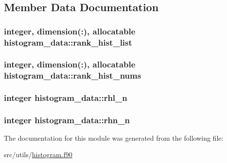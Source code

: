 \subsection{Member Data Documentation}
\hypertarget{classhistogram__data_a2f7cb336d665046859ebe5684ed09be8}{
\subsubsection[{rank\-\_\-hist\-\_\-list}]{\setlength{\rightskip}{0pt plus 5cm}integer, dimension(\-:), allocatable histogram\-\_\-data\-::rank\-\_\-hist\-\_\-list}}\label{classhistogram__data_a2f7cb336d665046859ebe5684ed09be8}
\hypertarget{classhistogram__data_a94a5c8fc25a86b8f62b2ff301de78d32}{
\subsubsection[{rank\-\_\-hist\-\_\-nums}]{\setlength{\rightskip}{0pt plus 5cm}integer, dimension(\-:), allocatable histogram\-\_\-data\-::rank\-\_\-hist\-\_\-nums}}\label{classhistogram__data_a94a5c8fc25a86b8f62b2ff301de78d32}
\hypertarget{classhistogram__data_ac202796c6c4bfb9c3a16bd8c4b277eba}{
\subsubsection[{rhl\-\_\-n}]{\setlength{\rightskip}{0pt plus 5cm}integer histogram\-\_\-data\-::rhl\-\_\-n}}\label{classhistogram__data_ac202796c6c4bfb9c3a16bd8c4b277eba}
\hypertarget{classhistogram__data_a8ac6a785fa075b9bf4d162e2833635d3}{
\subsubsection[{rhn\-\_\-n}]{\setlength{\rightskip}{0pt plus 5cm}integer histogram\-\_\-data\-::rhn\-\_\-n}}\label{classhistogram__data_a8ac6a785fa075b9bf4d162e2833635d3}


The documentation for this module was generated from the following file\-:\begin{DoxyCompactItemize}
\item 
src/utils/\hyperlink{histogram_8f90}{histogram.\-f90}\end{DoxyCompactItemize}
